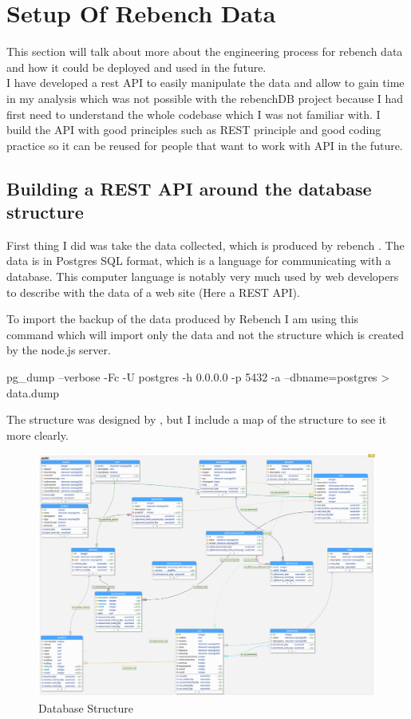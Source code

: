 \documentclass{article}
\begin{document}
\section{Setup Of Rebench Data}
This section will talk about more about the engineering process for rebench data and how it could be deployed and used in the future.\\
I have developed a rest API to easily manipulate the data and allow to gain time in my analysis which was not possible with the rebenchDB project because I had first need to understand the whole codebase which I was not familiar with. I build the API with good principles such as REST principle and good coding practice so it can be reused for people that want to work with API in the future.

\subsection{Building a REST API around the database structure}

First thing I did was take the data collected, which is produced by rebench \citep{ReBench:2018}. The data is in Postgres SQL format, which is a language for communicating with a database. This computer language is notably very much used by web developers to describe with the data of a web site (Here a REST API).

To import the backup of the data produced by Rebench I am using this command which will import only the data and not the structure which is created by the node.js server.

\begin{python}[h!]
pg_dump --verbose -Fc -U postgres -h 0.0.0.0 -p 5432  -a --dbname=postgres > data.dump
\end{python}

The structure was designed by \citep{ReBench:2018}, but I include a map of the structure to see it more clearly.


\begin{figure}[h!]
    \centering
    \includegraphics[width=1\textwidth]{images/database.png}
    \caption{Database Structure}
    \label{fig:database}
\end{figure}
\end{document}
